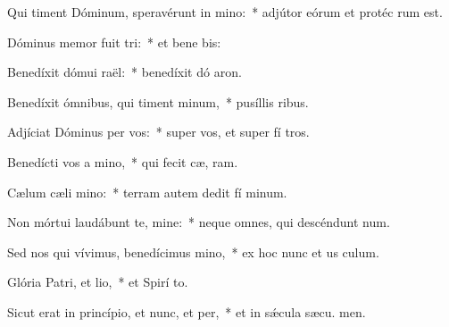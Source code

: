 \item Qui timent Dóminum, speravérunt in mino:~* adjútor eórum et protéc rum est.
\item Dóminus memor fuit tri:~* et bene bis:
\item Benedíxit dómui raël:~* benedíxit dó aron.
\item Benedíxit ómnibus, qui timent minum,~* pusíllis  ribus.
\item Adjíciat Dóminus per vos:~* super vos, et super fí tros.
\item Benedícti vos a mino,~* qui fecit cæ,  ram.
\item Cælum cæli mino:~* terram autem dedit fí minum.
\item Non mórtui laudábunt te, mine:~* neque omnes, qui descéndunt  num.
\item Sed nos qui vívimus, benedícimus mino,~* ex hoc nunc et us  culum.
\item Glória Patri, et lio,~* et Spirí to.
\item Sicut erat in princípio, et nunc, et per,~* et in sǽcula sæcu. men.
